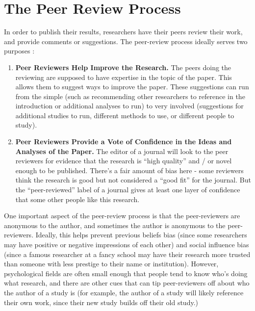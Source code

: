 \documentclass[
  letterpaper,
  DIV=11,
  numbers=noendperiod,
  oneside]{scrreprt}
\begin{document}
\section{The Peer Review Process}\label{the-peer-review-process}

In order to publish their results, researchers have their peers review
their work, and provide comments or suggestions. The peer-review process
ideally serves two purposes :~

\begin{enumerate}
\def\labelenumi{\arabic{enumi}.}
\item
  \textbf{Peer Reviewers Help Improve the Research.} The peers doing the
  reviewing are supposed to have expertise in the topic of the paper.
  This allows them to suggest ways to improve the paper. These
  suggestions can run from the simple (such as recommending other
  researchers to reference in the introduction or additional analyses to
  run) to very involved (suggestions for additional studies to run,
  different methods to use, or different people to study).
\item
  \textbf{Peer Reviewers Provide a Vote of Confidence in the Ideas and
  Analyses of the Paper.} The editor of a journal will look to the peer
  reviewers for evidence that the research is ``high quality'' and / or
  novel enough to be published. There's a fair amount of bias here -
  some reviewers think the research is good but not considered a ``good
  fit'' for the journal. But the ``peer-reviewed'' label of a journal
  gives at least one layer of confidence that some other people like
  this research.
\end{enumerate}

One important aspect of the peer-review process is that the
peer-reviewers are anonymous to the author, and sometimes the author is
anonymous to the peer-reviewers. Ideally, this helps prevent previous
beliefs bias (since some researchers may have positive or negative
impressions of each other) and social influence bias (since a famous
researcher at a fancy school may have their research more trusted than
someone with less prestige to their name or institution). However,
psychological fields are often small enough that people tend to know
who's doing what research, and there are other cues that can tip
peer-reviewers off about who the author of a study is (for example, the
author of a study will likely reference their own work, since their new
study builds off their old study.)
\end{document}
